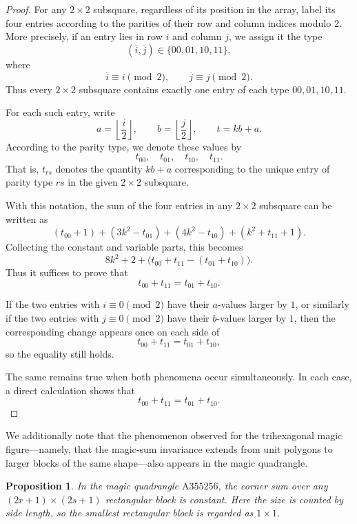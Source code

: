 \documentclass[11pt]{article}
\theoremstyle{plain}
\newtheorem{proposition}[theorem]{Proposition}
\theoremstyle{definition}
\begin{document}
\begin{proof}

For any \(2\times2\) subsquare, regardless of its position in the
array, label its four entries according to the parities of their row
and column indices modulo \(2\).  More precisely, if an entry lies in
row \(i\) and column \(j\), we assign it the type
\[
(\overline{i},\overline{j})
\in\{00,01,10,11\},
\]
where
\[
\overline{i}\equiv i\pmod 2,
\qquad
\overline{j}\equiv j\pmod 2.
\]
Thus every \(2\times2\) subsquare contains exactly one entry of each
type \(00,01,10,11\).

For each such entry, write
\[
a=\left\lfloor \frac{i}{2}\right\rfloor,
\qquad
b=\left\lfloor \frac{j}{2}\right\rfloor,
\qquad
t=kb+a.
\]
According to the parity type, we denote these values by
\[
t_{00},\quad t_{01},\quad t_{10},\quad t_{11}.
\]
That is, \(t_{rs}\) denotes the quantity \(kb+a\) corresponding to the
unique entry of parity type \(rs\) in the given \(2\times2\)
subsquare.

With this notation, the sum of the four entries in any \(2\times2\)
subsquare can be written as
\[
(t_{00}+1)+(3k^2-t_{01})+(4k^2-t_{10})+(k^2+t_{11}+1).
\]
Collecting the constant and variable parts, this becomes
\[
8k^2+2+\bigl(t_{00}+t_{11}-(t_{01}+t_{10})\bigr).
\]
Thus it suffices to prove that
\[
t_{00}+t_{11}=t_{01}+t_{10}.
\]

If the two entries with \(i\equiv 0\pmod 2\) have their \(a\)-values
larger by \(1\), or similarly if the two entries with
\(j\equiv 0\pmod 2\) have their \(b\)-values larger by \(1\), then the
corresponding change appears once on each side of
\[
t_{00}+t_{11}=t_{01}+t_{10},
\]
so the equality still holds.

The same remains true when both phenomena occur simultaneously.  In
each case, a direct calculation shows that
\[
t_{00}+t_{11}=t_{01}+t_{10}.
\]

\end{proof}


We additionally note that the phenomenon observed for the trihexagonal
magic figure—namely, that the magic-sum invariance extends from unit
polygons to larger blocks of the same shape—also appears in the magic
quadrangle.


\begin{proposition}
In the magic quadrangle \(\mathrm{A355256}\),\cite{OEISA355256}
the corner sum over any \((2r+1)\times(2s+1)\) rectangular block is constant.
Here the size is counted by side length, so the smallest rectangular
block is regarded as \(1\times1\).
\end{proposition}
\end{document}
